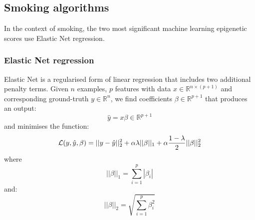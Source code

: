 \documentclass{article} %
\newcommand{\equationname}[1]{%
    \begingroup
        \leavevmode
        \addcontentsline{equ}{equations}{\protect\numberline{\theequation}#1}%
    \endgroup   
}
\begin{document}
\subsection{Smoking algorithms}
In the context of smoking, the two most significant machine learning epigenetic scores use Elastic Net regression.

\subsubsection{Elastic Net regression} \label{sec:lin-elastic-net}
Elastic Net \cite{zou2005regularization} is a regularised form of linear regression that includes two additional penalty terms.
Given \(n\) examples, \(p\) features with data \(x \in \mathbb{R}^{n \times (p + 1)}\) and corresponding ground-truth \(y \in \mathbb{R}^n\), we find coefficients \(\beta \in \mathbb{R}^{p + 1}\) that produces an output:
\[\hat{y} = x \beta \in \mathbb{R}^{p + 1}\]
and minimises the function:
\begin{equation} \equationname{Elastic Net linear regression} \label{eqn:lin_elastic_net}
    \mathcal{L}(y, \hat{y}, \beta) = ||y - \hat{y}||_2^2 + \alpha\lambda||\beta||_1 + \alpha\frac{1 - \lambda}{2}||\beta||_2^2
\end{equation}
where
\[||\beta||_1 = \sum_{i=1}^{p} |\beta_i|\]
and:
\[||\beta||_2 = \sqrt{\sum_{i=1}^{p} \beta_i^2}\]
\end{document}
